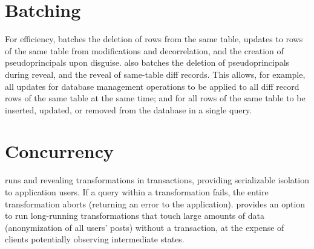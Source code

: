 \section{Batching}
\label{s:impl:batching}

For efficiency, \sys batches the deletion of rows from the same table, updates
to rows of the same table from modifications and decorrelation, and the creation
of pseudoprincipals upon disguise. 
%
\sys also batches the deletion of pseudoprincipals during reveal, and 
the reveal of same-table diff records. This allows, for example, all updates for
database management operations to be applied to all diff record rows of the same
table at the same time; and for all rows of the same table to be inserted,
updated, or removed from the database in a single query.
%

%
\section{Concurrency}
%
\sys runs \xxing and revealing transformations in transactions, providing
serializable isolation to application users.
%
If a query within a transformation fails, the entire transformation aborts
(returning an error to the application).
%
\sys provides an option to run long-running transformations that
touch large amounts of data (\eg anonymization of all users' posts) without a
transaction, at the expense of clients potentially observing intermediate
states.
%


%
%

